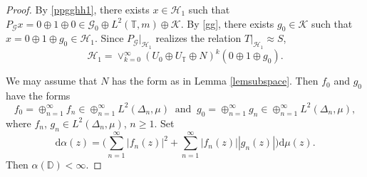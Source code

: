 \documentclass[a4paper,oneside,11pt]{amsart}
\numberwithin{equation}{section}
\theoremstyle{plain}
\theoremstyle{definition}
\begin{document}
\begin{proof}
By \eqref{ppgghh1}, 
there exists $x\in\mathcal H_1$ such that $P_{\mathcal G}x=0\oplus 1\oplus 0\in\mathcal G_0\oplus L^2(\mathbb T,m)\oplus\mathcal K$. 
By \eqref{gg},  there exists $g_0\in\mathcal K$ such that $x=0\oplus 1\oplus g_0\in\mathcal H_1$. 
 Since  $P_{\mathcal G}|_{\mathcal H_1}$ realizes the relation $T|_{\mathcal H_1}\approx S$, 
\begin{equation}\label{spanhh1} \mathcal H_1=\vee_{k=0}^\infty
(U_0\oplus U_{\mathbb T}\oplus N)^k(0\oplus 1\oplus g_0).
\end{equation}

We may assume that $N$ has the form as in Lemma \ref{lemsubspace}. Then $f_0$ and $g_0$ have the forms 
\begin{equation*}f_0=\oplus_{n=1}^\infty f_n\in\oplus_{n=1}^\infty L^2(\Delta_n,\mu)
\ \text{ and }\  g_0=\oplus_{n=1}^\infty g_n\in\oplus_{n=1}^\infty L^2(\Delta_n,\mu),
\end{equation*}
 where $f_n$, $g_n\in L^2(\Delta_n,\mu)$, $n\geq 1$. 
Set 
\begin{equation*}
\mathrm{d}\alpha(z)=\Big(\sum_{n=1}^\infty|f_n(z)|^2+\sum_{n=1}^\infty|f_n(z)||g_n(z)|\Big)\mathrm{d}\mu(z).
\end{equation*}
Then $\alpha(\mathbb D)<\infty$. 


\end{proof}
\end{document}
